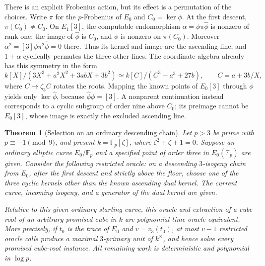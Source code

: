\documentclass[11pt]{article}
\newtheorem{theorem}{Theorem}[section]
\theoremstyle{definition}
\theoremstyle{remark}
\begin{document}
There is an explicit Frobenius action, but its effect is a permutation
of the choices.  Write $\pi$ for the $p$-Frobenius of $E_0$ and
$C_0=\ker\phi$.  At the first descent, $\pi(C_0)\ne C_0$.
On $E_1[3]$, the computable endomorphism
$\alpha=\phi\pi\widehat\phi$ is nonzero of rank one: the image of
$\widehat\phi$ is $C_0$, and $\phi$ is nonzero on $\pi(C_0)$.
Moreover $\alpha^2=[3]\phi\pi^2\widehat\phi=0$ there.
Thus its kernel and image are the ascending line, and $1+\alpha$
cyclically permutes the three other lines.  The coordinate algebra
already has this symmetry in the form
\[
 k[X]/(3X^3+a^2X^2+3abX+3b^2)
 \simeq k[C]/(C^3-a^3+27b),\qquad C=a+3b/X,
\]
where $C\mapsto\zeta_3C$ rotates the roots.  Mapping the known points
of $E_0[3]$ through $\phi$ yields only $\ker\widehat\phi$, because
$\widehat\phi\phi=[3]$.  A nonparent continuation instead corresponds
to a cyclic subgroup of order nine above $C_0$; its preimage cannot be
$E_0[3]$, whose image is exactly the excluded ascending line.


\begin{theorem}[Selection on an ordinary descending chain]
\label{thm:restricted-volcano-oracle}
Let $p>3$ be prime with $p\equiv-1\pmod9$, and present
$k=\mathbb F_p[\zeta]$, where $\zeta^2+\zeta+1=0$.
Suppose an ordinary elliptic curve $E_0/\mathbb F_p$ and a
specified point of order three in $E_0(\mathbb F_p)$ are given.
Consider the following restricted oracle: on a descending
$3$-isogeny chain from $E_0$, after the first descent and strictly
above the floor, choose one of the three cyclic kernels other
than the known ascending dual kernel.  The current curve, incoming
isogeny, and a generator of the dual kernel are given.

Relative to this given ordinary starting curve, this oracle and
extraction of a cube root of an arbitrary promised cube in $k$
are polynomial-time oracle equivalent.  More precisely, if $t_0$
is the trace of $E_0$ and $v=v_3(t_0)$, at most $v-1$ restricted
oracle calls produce a maximal $3$-primary unit of $k^\times$,
and hence solve every promised cube-root instance.  All remaining
work is deterministic and polynomial in $\log p$.
\end{theorem}
\end{document}

